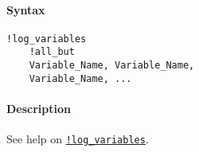 


	\paragraph{Syntax}\label{syntax}

\begin{verbatim}
!log_variables
    !all_but
    Variable_Name, Variable_Name, 
    Variable_Name, ...
\end{verbatim}

\paragraph{Description}\label{description}

See help on \href{modellang/logvariables}{\texttt{!log\_variables}}.


